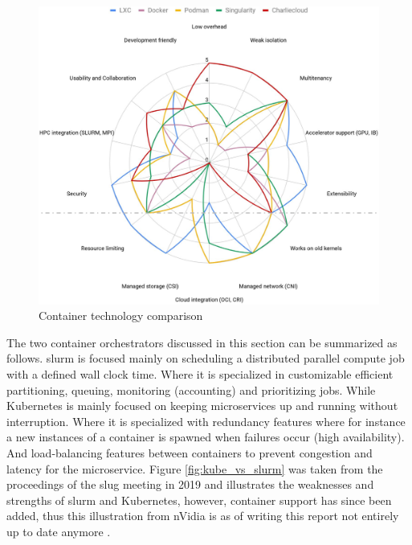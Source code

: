 \documentclass[conference]{IEEEtran}
\begin{document}
\begin{figure}[H]
\centering
\includegraphics[width=\columnwidth]{images/container_tech.png}
\caption{Container technology comparison}
\label{fig:container-tech}
\end{figure}

The two container orchestrators discussed in this section can be summarized as follows. \gls{slurm} is focused mainly on scheduling a distributed parallel compute job with a defined wall clock time. Where it is specialized in customizable efficient partitioning, queuing, monitoring (accounting) and prioritizing jobs. While Kubernetes is mainly focused on keeping microservices up and running without interruption. Where it is specialized with redundancy features where for instance a new instances of a container is spawned when failures occur (high availability). And load-balancing features between containers to prevent congestion and latency for the microservice. Figure \ref{fig:kube_vs_slurm} was taken from the proceedings of the \gls{slug} meeting in 2019 and illustrates the weaknesses and strengths of \gls{slurm} and Kubernetes, however, container support has since been added, thus this illustration from nVidia is as of writing this report not entirely up to date anymore \cite{nvidia-slurm-containers}.
\end{document}
